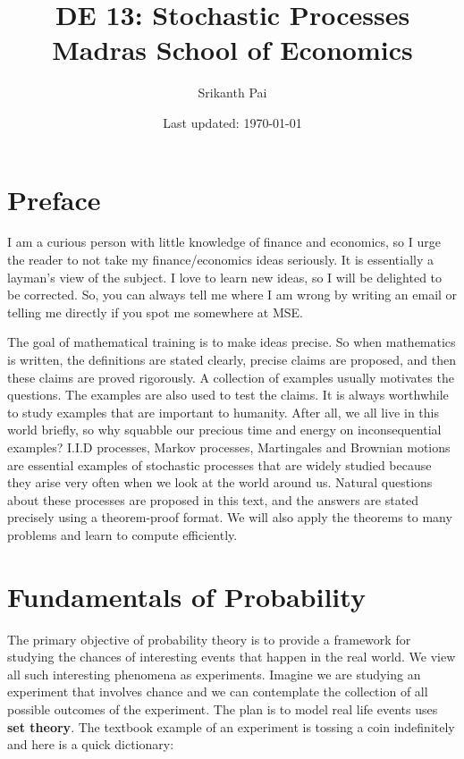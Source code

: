 \documentclass[letterpaper, 12pt]{article}
\newcommand{\1}{\mathds{1}} %
\theoremstyle{definition}
\begin{document}

\title{DE 13: Stochastic Processes \\[1em]
\normalsize Madras School of Economics}


\author{\normalsize Srikanth Pai}
\date{\normalsize\vspace{-1ex} Last updated: \today}


\maketitle
\tableofcontents\label{sec:contents}

\newpage
\section*{Preface}

I am a curious person with little knowledge of finance and economics, so I urge the reader to not take my finance/economics ideas seriously. It is essentially a layman’s view of the subject. I love to learn new ideas, so I will be delighted to be corrected. So, you can always tell me where I am wrong by writing an email or telling me directly if you spot me somewhere at MSE.

The goal of mathematical training is to make ideas precise. So when mathematics is written, the definitions are stated clearly, precise claims are proposed, and then these claims are proved rigorously. A collection of examples usually motivates the questions. The examples are also used to test the claims. It is always worthwhile to study examples that are important to humanity. After all, we all live in this world briefly, so why squabble our precious time and energy on inconsequential examples? I.I.D processes, Markov processes, Martingales and Brownian motions are essential examples of stochastic processes that are widely studied because they arise very often when we look at the world around us. Natural questions about these processes are proposed in this text, and the answers are stated precisely using a theorem-proof format. We will also apply the theorems to many problems and learn to compute efficiently.
\newpage

\section{Fundamentals of Probability}
The primary objective of probability theory is to provide a framework for studying the chances of interesting events that happen in the real world. We view all such interesting phenomena as experiments. Imagine we are studying an experiment that involves chance and we can contemplate the collection of all possible outcomes of the experiment. The plan is to model real life events uses {\bf set theory}. The textbook example of an experiment is tossing a coin indefinitely and here is a quick dictionary:
\end{document}
